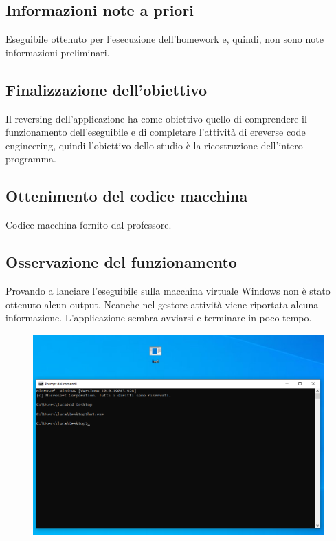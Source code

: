 \documentclass[a4paper, 12pt]{article}
\begin{document}
\subsection{Informazioni note a priori}
Eseguibile ottenuto per l'esecuzione dell'homework e, quindi, non sono note informazioni preliminari.

\subsection{Finalizzazione dell'obiettivo}
Il reversing dell'applicazione ha come obiettivo quello di comprendere il funzionamento dell'eseguibile e di completare l'attività di e{reverse code engineering}, quindi l'obiettivo dello studio è la ricostruzione dell'intero programma.

\subsection{Ottenimento del codice macchina}
Codice macchina fornito dal professore.


\subsection{Osservazione del funzionamento}
Provando a lanciare l'eseguibile sulla macchina virtuale Windows non è stato ottenuto alcun output. Neanche nel gestore attività viene riportata alcuna informazione. L'applicazione sembra avviarsi e terminare in poco tempo.\newline

\begin{figure}[H]
\centering\includegraphics[width=\textwidth]{esecution}
\end{figure}
\end{document}
